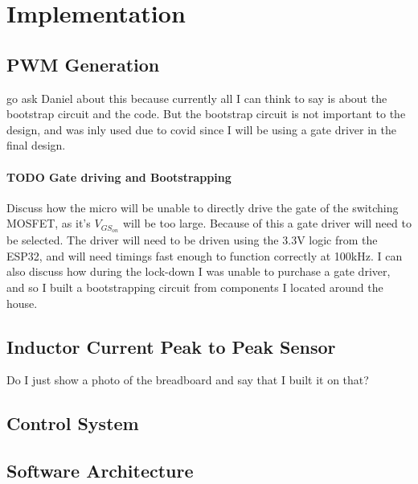 \chapter{Implementation}\label{C:implementation}


\section{PWM Generation}\label{S:pwm_gen_impl}

go ask Daniel about this because currently all I can think to say is about the bootstrap circuit and the code. But the bootstrap circuit is not important to the design, and was inly used due to covid since I will be using a gate driver in the final design. 

\subsubsection{TODO Gate driving and Bootstrapping} 

Discuss how the micro will be unable to directly drive the gate of the switching MOSFET, as it's $V_{GS_{on}}$ will be too large. Because of this a gate driver will need to be selected. The driver will need to be driven using the 3.3V logic from the ESP32, and will need timings fast enough to function correctly at 100kHz. I can also discuss how during the lock-down I was unable to purchase a gate driver, and so I built a bootstrapping circuit from components I located around the house. 


\section{Inductor Current Peak to Peak Sensor}\label{S:current_sense_impl}

Do I just show a photo of the breadboard and say that I built it on that?  


\section{Control System}\label{S:control_impl}


\section{Software Architecture}

